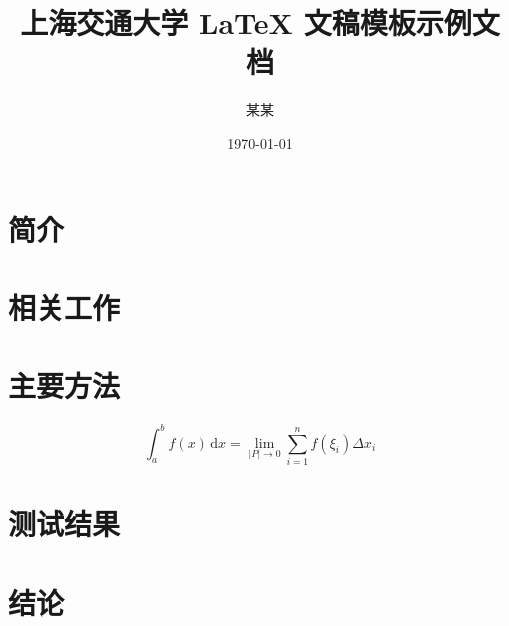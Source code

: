 \documentclass{sjtuarticle}
\title{上海交通大学 \LaTeX{} 文稿模板示例文档}
\author{某\quad{}某}
\date{\today}
\begin{document}
\maketitle

\begin{abstract}
  \zhlipsum[1]
\end{abstract}

\section{简介}

\zhlipsum[2]

\section{相关工作}

\zhlipsum[3]

\section{主要方法}

\zhlipsum[4-5]

\begin{equation}
  \int_{a}^b f(x)\,\mathrm{d}x=\lim_{|P|\rightarrow 0}\sum_{i=1}^n f(\xi_i)\Delta x_i
\end{equation}

\section{测试结果}

\zhlipsum[6]

\section{结论}

\zhlipsum[7]

\nocite{*}
\printbibliography[heading=bibintoc]
\end{document}
